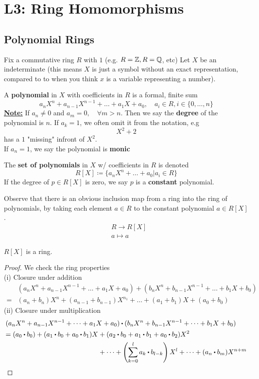 \documentclass[../Main.tex]{subfiles}
\begin{document}
	\chapter{L3: Ring Homomorphisms}
	\section*{Polynomial Rings}
	Fix a commutative ring $R$ with $1$ (e.g. $R=\mathbb{Z}, R=\mathbb{Q}$, etc)
	Let $X$ be an indeterminate (this means $X$ is just a symbol without an exact representation, compared to to when you think $x$ is a variable representing a number).
	\begin{dfn}[title = Polynomial in a ring]
		A \textbf{polynomial} in $X$ with coefficients in $R$ is a formal, finite sum
		\[a_nX^n+a_{n-1}X^{n-1}+\dots+a_1X+a_0, \quad a_i\in R, i\in \{0, \dots, n\}\]
		\textbf{\underline{Note:}} If $a_n\ne 0$ and $a_m=0, \quad \forall m>n$. Then we say the \textbf{degree} of the polynomial is $n$.
		If $a_k=1$, we often omit it from the notation, e.g
		\[X^2+2\]
		has a $1$ "missing" infront of $X^2$.\\
		If $a_n=1$, we say the polynomial is \textbf{monic} 
	\end{dfn}
	\begin{dfn}[title=Ring of Polynomials and Constant Polynomial]
		The \textbf{set of polynomials} in $X$ w/ coefficients in $R$ is denoted
		\[R[X] \coloneqq \{a_nX^n+\dots+a_0|a_i \in R\} \]
		If the degree of $p\in R[X]$ is zero, we say $p$ is a \textbf{constant} polynomial.
	\end{dfn}
	Observe that there is an obvious inclusion map from a ring into the ring of polynomials, by taking each element $a\in R$ to the constant polynomial $a\in R[X]$.
	\begin{align*}
		&R \to R[X]\\
		&a\mapsto a
	\end{align*}
	\begin{claim}
		$R[X]$ is a ring.
	\end{claim}
	\begin{proof}We check the ring properties \\
		(i) Closure under addition
		\begin{align*}
		&(a_nX^n+a_{n-1}X^{n-1}+\dots+ a_1X+a_0) + (b_nX^n+b_{n-1}X^{n-1}+\dots+b_1X+b_0) \\
		=& (a_n+b_n)X^n +(a_{n-1}+b_{n-1})X^{n_1}+\dots+(a_1+b_1)X+(a_0+b_0)
		\end{align*}
		(ii) Closure under multiplication
		\begin{align*}
			&(a_nX^n+a_{n-1}X^{n-1}+\dots+ a_1X+a_0) \rdot (b_nX^n+b_{n-1}X^{n-1}+\dots+b_1X+b_0) \\
			& \begin{aligned}=(a_0\rdot b_0)+(a_1\rdot b_0+a_0\rdot b_1)X &+ (a_2\rdot b_0 + a_1\rdot b_1+a_0\rdot b_2)X^2\\
			&+\dots+\left(\sum_{k=0}^{l}a_k\rdot b_{l-k}\right) X^l + \dots + (a_n\rdot b_m)X^{n+m} \qedhere
			\end{aligned}
		\end{align*}
	\end{proof}
\end{document}
